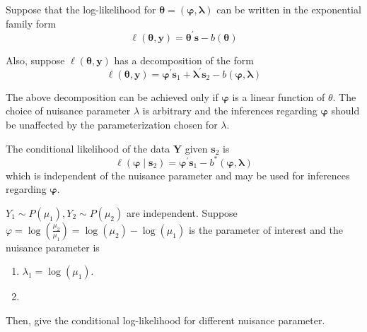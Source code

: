 Suppose that the log-likelihood for $\boldsymbol{\theta}=\left(\boldsymbol{\varphi},\boldsymbol{\lambda}\right)$ can be written in the exponential family form
\begin{equation}
    \ell\left(\boldsymbol{\theta},\mathbf{y}\right)=\boldsymbol{\theta}^{\prime}\mathbf{s}-b\left(\boldsymbol{\theta}\right)
\end{equation}

Also, suppose $\ell\left(\boldsymbol{\theta},\mathbf{y}\right)$ has a decomposition of the form
\begin{equation}
    \ell\left(\boldsymbol{\theta},\mathbf{y}\right)=\boldsymbol{\varphi}^{\prime}\mathbf{s}_{1}+\boldsymbol{\lambda}^{\prime}\mathbf{s}_{2}-b(\boldsymbol{\varphi},\boldsymbol{\lambda})
\end{equation}

\begin{remark}
    The above decomposition can be achieved only if $\boldsymbol{\varphi}$ is a linear function of $\theta$. The choice of nuisance parameter $\lambda$ is arbitrary and the inferences regarding $\boldsymbol{\varphi}$ should be unaffected by the parameterization chosen for $\lambda$.
\end{remark}

The conditional likelihood of the data $\mathbf{Y}$ given $\mathbf{s}_{2}$ is
\begin{equation}
    \ell\left(\boldsymbol{\varphi}\mid\mathbf{s}_{2}\right)=\boldsymbol{\varphi}^{\prime}\mathbf{s}_{1}-b^{*}\left(\boldsymbol{\varphi},\boldsymbol{\lambda}\right)
\end{equation}
which is independent of the nuisance parameter and may be used for inferences regarding $\boldsymbol{\varphi}$.

\begin{example}
    $Y_{1}\sim P\left(\mu_{1}\right),Y_{2}\sim P\left(\mu_{2}\right)$ are independent. Suppose $\varphi=\log\left(\frac{\mu_{2}}{\mu_{1}}\right)=\log\left(\mu_{2}\right)-\log\left(\mu_{1}\right)$ is the parameter of interest and the nuisance parameter is
    \begin{enumerate}
        \item $\lambda_{1}=\log\left(\mu_{1}\right)$.
        \item
    \end{enumerate}
    Then, give the conditional log-likelihood for different nuisance parameter.
\end{example}

